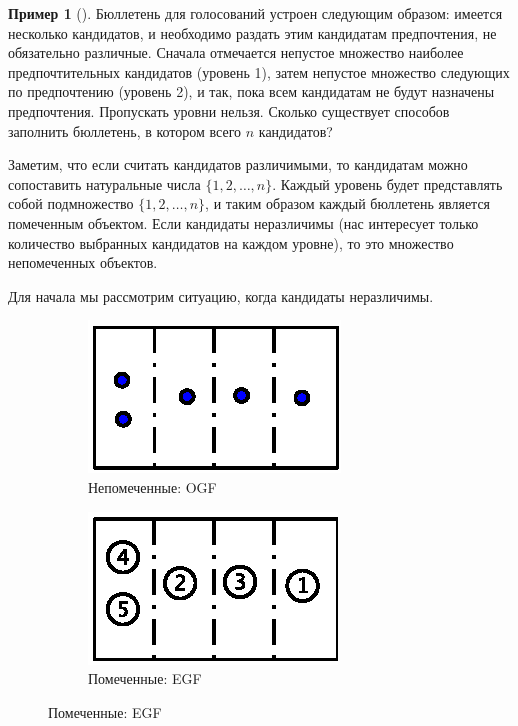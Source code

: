\documentclass{article}
\theoremstyle{definition}
\newtheorem{example}{Пример}
\begin{document}
\begin{example}[{\cite[Example 10, p.36]{species}}]
Бюллетень для голосований устроен следующим образом: имеется несколько 
кандидатов, и необходимо раздать этим кандидатам предпочтения, не обязательно 
различные. Сначала отмечается 
непустое множество наиболее предпочтительных кандидатов (уровень 1), затем 
непустое множество следующих по предпочтению (уровень 2), и так, 
пока всем кандидатам не будут назначены предпочтения. Пропускать уровни нельзя. 
Сколько 
существует способов заполнить бюллетень, в котором всего \( n \) кандидатов? 

Заметим, что если считать кандидатов различимыми, то кандидатам можно 
сопоставить натуральные числа \( \{1, 2, \ldots, n\} \). Каждый уровень будет 
представлять собой подмножество \( \{1,2,\ldots, n\} \), и таким образом 
каждый бюллетень является помеченным объектом. Если кандидаты 
неразличимы (нас интересует только количество выбранных кандидатов на каждом 
уровне), то это множество непомеченных объектов.

Для начала мы рассмотрим ситуацию, когда кандидаты неразличимы. 

	\begin{figure}[h]
	\centering
    \begin{subfigure}{.5\textwidth}
    	\centering
		\includegraphics[width=.5\textwidth]{ballots_1.eps}
		\caption{Непомеченные: OGF}
		\label{fig:unrooted_trees}	
	\end{subfigure}%
    \begin{subfigure}{.5\textwidth}
		\centering
		\includegraphics[width=.5\textwidth]{ballots_2.eps}
		\caption{Помеченные: EGF}
		\label{fig:cycle_unrooted}	
	\end{subfigure}%
    \end{figure}



\end{example}
\end{document}
